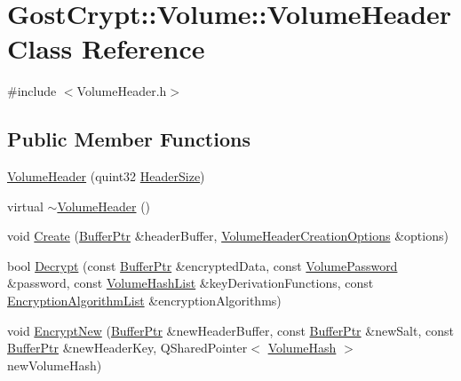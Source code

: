 \hypertarget{class_gost_crypt_1_1_volume_1_1_volume_header}{}\section{Gost\+Crypt\+:\+:Volume\+:\+:Volume\+Header Class Reference}
\label{class_gost_crypt_1_1_volume_1_1_volume_header}


{\ttfamily \#include $<$Volume\+Header.\+h$>$}

\subsection*{Public Member Functions}
\begin{DoxyCompactItemize}
\item 
\hyperlink{class_gost_crypt_1_1_volume_1_1_volume_header_a90ef0291205dcc6f555f68d81d4da8c4}{Volume\+Header} (quint32 \hyperlink{class_gost_crypt_1_1_volume_1_1_volume_header_ab4dbd75d926241b0b0430a5f57e67a97}{Header\+Size})
\item 
virtual \hyperlink{class_gost_crypt_1_1_volume_1_1_volume_header_a1fcd2d0e4c76a06a68608f0353aedf31}{$\sim$\+Volume\+Header} ()
\item 
void \hyperlink{class_gost_crypt_1_1_volume_1_1_volume_header_aae6649483930b381ba33251d1fa3eac8}{Create} (\hyperlink{class_gost_crypt_1_1_buffer_ptr}{Buffer\+Ptr} \&header\+Buffer, \hyperlink{struct_gost_crypt_1_1_volume_1_1_volume_header_creation_options}{Volume\+Header\+Creation\+Options} \&options)
\item 
bool \hyperlink{class_gost_crypt_1_1_volume_1_1_volume_header_a498878278e9415c2475e0fe53da56978}{Decrypt} (const \hyperlink{class_gost_crypt_1_1_buffer_ptr}{Buffer\+Ptr} \&encrypted\+Data, const \hyperlink{class_gost_crypt_1_1_volume_1_1_volume_password}{Volume\+Password} \&password, const \hyperlink{namespace_gost_crypt_1_1_volume_a513257938e5ea0554ad83d0eb08f8f67}{Volume\+Hash\+List} \&key\+Derivation\+Functions, const \hyperlink{namespace_gost_crypt_1_1_volume_ae58c307b345c639d35f6dc68af4017b5}{Encryption\+Algorithm\+List} \&encryption\+Algorithms)
\item 
void \hyperlink{class_gost_crypt_1_1_volume_1_1_volume_header_a1c2ed40301cf445862f0f53f46d2cf4e}{Encrypt\+New} (\hyperlink{class_gost_crypt_1_1_buffer_ptr}{Buffer\+Ptr} \&new\+Header\+Buffer, const \hyperlink{class_gost_crypt_1_1_buffer_ptr}{Buffer\+Ptr} \&new\+Salt, const \hyperlink{class_gost_crypt_1_1_buffer_ptr}{Buffer\+Ptr} \&new\+Header\+Key, Q\+Shared\+Pointer$<$ \hyperlink{class_gost_crypt_1_1_volume_1_1_volume_hash}{Volume\+Hash} $>$ new\+Volume\+Hash)

\end{DoxyCompactItemize}
